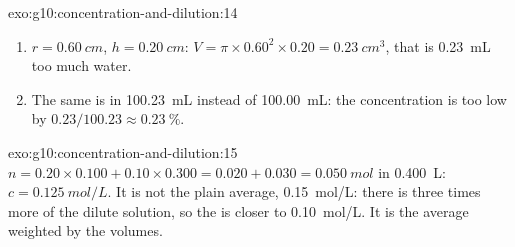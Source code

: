 \begin{solution}{exo:g10:concentration-and-dilution:14}
\begin{enumerate}
  \item $r = \qty{0.60}{cm}$, $h = \qty{0.20}{cm}$:
        $V = \pi \times 0.60^2 \times 0.20 = \qty{0.23}{cm^3}$, that is
        \qty{0.23}{mL} too much water.
  \item The same  is in \qty{100.23}{mL} instead of \qty{100.00}{mL}:
        the concentration is too low by $0.23 / 100.23 \approx
        \qty{0.23}{\percent}$.
\end{enumerate}
\end{solution}

\begin{solution}{exo:g10:concentration-and-dilution:15}
$n = 0.20 \times 0.100 + 0.10 \times 0.300 = 0.020 + 0.030 =
\qty{0.050}{mol}$ in \qty{0.400}{L}: $c = \qty{0.125}{mol/L}$. It is not
the plain average, \qty{0.15}{mol/L}: there is three times more of the
dilute solution, so the  is closer to \qty{0.10}{mol/L}. It is the
average weighted by the volumes.
\end{solution}

